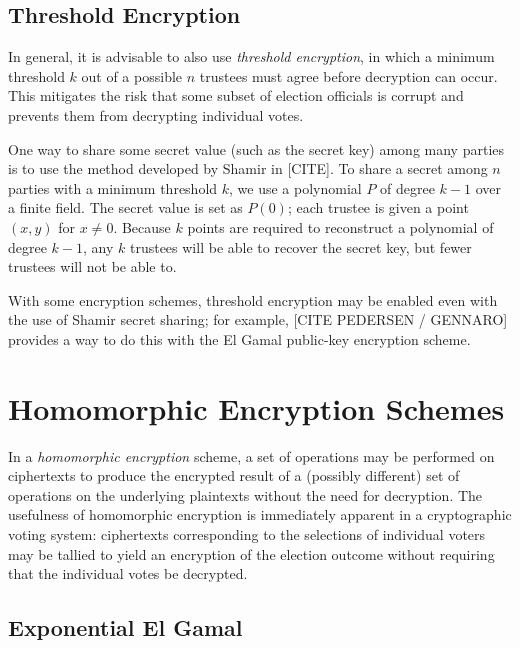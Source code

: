 \subsection{Threshold Encryption}
In general, it is advisable to also use \emph{threshold encryption}, in which a minimum threshold $k$ out of a possible $n$ trustees must agree before decryption can occur. This mitigates the risk that some subset of election officials is corrupt and prevents them from decrypting individual votes.

One way to share some secret value (such as the secret key) among many parties is to use the method developed by Shamir in [CITE]. To share a secret among $n$ parties with a minimum threshold $k$, we use a polynomial $P$ of degree $k-1$ over a finite field. The secret value is set as $P(0)$; each trustee is given a point $(x, y)$ for $x \neq 0$. Because $k$ points are required to reconstruct a polynomial of degree $k-1$, any $k$ trustees will be able to recover the secret key, but fewer trustees will not be able to.

With some encryption schemes, threshold encryption may be enabled even with the use of Shamir secret sharing; for example, [CITE PEDERSEN / GENNARO] provides a way to do this with the El Gamal public-key encryption scheme.

\section{Homomorphic Encryption Schemes}

In a \emph{homomorphic encryption} scheme, a set of operations may be performed on ciphertexts to produce the encrypted result of a (possibly different) set of operations on the underlying plaintexts without the need for decryption. The usefulness of homomorphic encryption is immediately apparent in a cryptographic voting system: ciphertexts corresponding to the selections of individual voters may be tallied to yield an encryption of the election outcome without requiring that the individual votes be decrypted.

\subsection{Exponential El Gamal}

